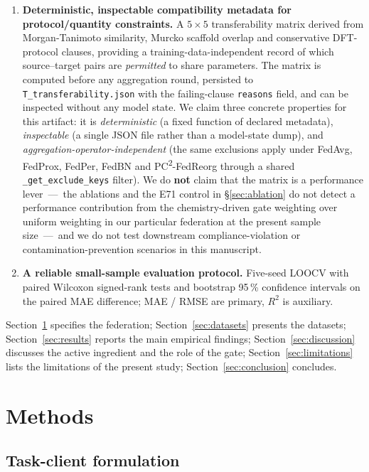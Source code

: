 \documentclass[11pt,a4paper]{article}
\newcommand{\PC}{PC\textsuperscript{2}-FedReorg}
\begin{document}
\begin{enumerate}
  \item \textbf{Deterministic, inspectable compatibility metadata for protocol/quantity constraints.} A $5 \times 5$ transferability matrix derived from Morgan-Tanimoto similarity, Murcko scaffold overlap and conservative DFT-protocol clauses, providing a training-data-independent record of which source--target pairs are \emph{permitted} to share parameters. The matrix is computed before any aggregation round, persisted to \texttt{T\_transferability.json} with the failing-clause \texttt{reasons} field, and can be inspected without any model state. We claim three concrete properties for this artifact: it is \emph{deterministic} (a fixed function of declared metadata), \emph{inspectable} (a single JSON file rather than a model-state dump), and \emph{aggregation-operator-independent} (the same exclusions apply under FedAvg, FedProx, FedPer, FedBN and \PC{} through a shared \texttt{\_get\_exclude\_keys} filter). We do \textbf{not} claim that the matrix is a performance lever~---~the ablations and the E71 control in \S\ref{sec:ablation} do not detect a performance contribution from the chemistry-driven gate weighting over uniform weighting in our particular federation at the present sample size~---~and we do not test downstream compliance-violation or contamination-prevention scenarios in this manuscript.
  \item \textbf{A reliable small-sample evaluation protocol.} Five-seed LOOCV with paired Wilcoxon signed-rank tests and bootstrap 95\,\% confidence intervals on the paired MAE difference; MAE / RMSE are primary, $R^2$ is auxiliary.
\end{enumerate}

Section~\ref{sec:methods} specifies the federation; Section~\ref{sec:datasets} presents the datasets; Section~\ref{sec:results} reports the main empirical findings; Section~\ref{sec:discussion} discusses the active ingredient and the role of the gate; Section~\ref{sec:limitations} lists the limitations of the present study; Section~\ref{sec:conclusion} concludes.

\section{Methods}\label{sec:methods}

\subsection{Task-client formulation}\label{sec:task-client}
\end{document}
